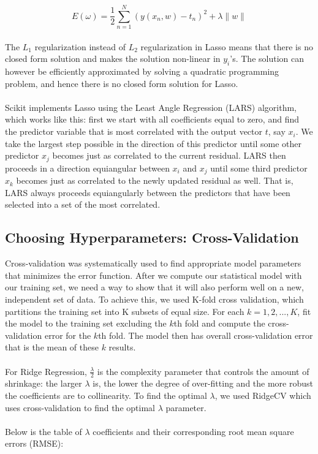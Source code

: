 \documentclass[letterpaper]{article}
\begin{document}
$$E(\omega) = \frac{1}{2} \sum_{n=1}^N (y(x_n,w) - t_n)^2 + \lambda \lVert w \rVert$$
\\
The $L_1$ regularization instead of $L_2$ regularization in Lasso means that there is no closed form solution and makes the solution non-linear in $y_i$'s. The solution can however be efficiently approximated by solving a quadratic programming problem, and hence there is no closed form solution for Lasso.\\
\\
Scikit implements Lasso using the Least Angle Regression (LARS) algorithm, which works like this: first we start with all coefficients equal to zero, and find the predictor variable that is most correlated with the output vector $t$, say $x_i$. We take the largest step possible in the direction of this predictor until some other predictor $x_j$ becomes just as correlated to the current residual. LARS then proceeds in a direction equiangular between $x_i$ and $x_j$ until some third predictor $x_k$ becomes just as correlated to the newly updated residual as well. That is, LARS always proceeds equiangularly between the predictors that have been selected into a set of the most correlated.

\subsection{Choosing Hyperparameters: Cross-Validation}
Cross-validation was systematically used to find appropriate model parameters that minimizes the error function. After we compute our statistical model with our training set, we need a way to show that it will also perform well on a new, independent set of data. To achieve this, we used K-fold cross validation, which partitions the training set into K subsets of equal size. For each $k = 1,2,...,K$, fit the model to the training set excluding the $k$th fold and compute the cross-validation error for the $k$th fold. The model then has overall cross-validation error that is the mean of these $k$ results. \\
\\
\noindent For Ridge Regression, $\frac{\lambda}{2}$ is the complexity parameter that controls the amount of shrinkage: the larger $\lambda$ is, the lower the degree of over-fitting and the more robust the coefficients are to collinearity. To find the optimal $\lambda$, we used RidgeCV which uses cross-validation to find the optimal $\lambda$ parameter.\\
\\
Below is the table of $\lambda$ coefficients and their corresponding root mean square errors (RMSE):\\
\end{document}
